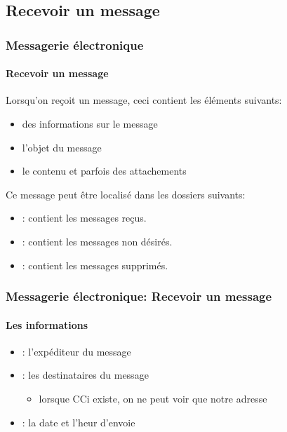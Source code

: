 \documentclass[xcolor=table]{beamer}
\begin{document}
\subsection{Recevoir un message}

\begin{frame}
\frametitle{Messagerie électronique}
\framesubtitle{Recevoir un message}

Lorsqu'on reçoit un message, ceci contient les éléments suivants: 
\begin{itemize}
	\item des informations sur le message
	\item l'objet du message
	\item le contenu et parfois des attachements
\end{itemize}

Ce message peut être localisé dans les dossiers suivants:
\begin{itemize}
	\item {}: contient les messages reçus.
	\item {}: contient les messages non désirés.
	\item {}: contient les messages supprimés.
\end{itemize}

\end{frame}

\begin{frame}
\frametitle{Messagerie électronique: Recevoir un message}
\framesubtitle{Les informations}

\begin{itemize}
	\item {}: l'expéditeur du message
	
	\item {}: les destinataires du message 
	\begin{itemize}
		\item lorsque CCi existe, on ne peut voir que notre adresse 
	\end{itemize}
	
	\item {}: la date et l'heur d'envoie  
	
\end{itemize}


\end{frame}
\end{document}

